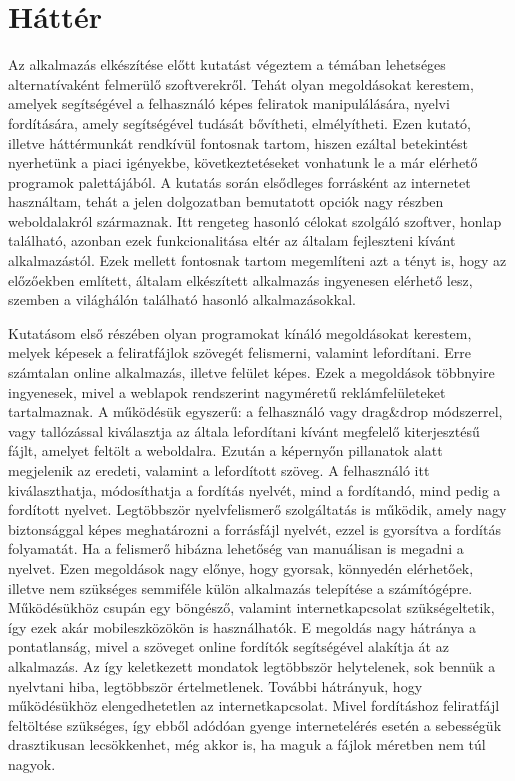 \chapter{Háttér}
Az alkalmazás elkészítése előtt kutatást végeztem a témában lehetséges alternatívaként felmerülő szoftverekről. Tehát olyan megoldásokat kerestem, amelyek segítségével a felhasználó képes feliratok manipulálására, nyelvi fordítására, amely segítségével tudását bővítheti, elmélyítheti. Ezen kutató, illetve háttérmunkát rendkívül fontosnak tartom, hiszen ezáltal betekintést nyerhetünk a piaci igényekbe, következtetéseket vonhatunk le a már elérhető programok palettájából. A kutatás során elsődleges forrásként az internetet használtam, tehát a jelen dolgozatban bemutatott opciók nagy részben weboldalakról származnak. Itt rengeteg hasonló célokat szolgáló szoftver, honlap található, azonban ezek funkcionalitása eltér az általam fejleszteni kívánt alkalmazástól. Ezek mellett fontosnak tartom megemlíteni azt a tényt is, hogy az előzőekben említett, általam elkészített alkalmazás ingyenesen elérhető lesz, szemben a világhálón található hasonló alkalmazásokkal.

Kutatásom első részében olyan programokat kínáló megoldásokat kerestem, melyek képesek a feliratfájlok szövegét felismerni, valamint lefordítani. Erre számtalan online alkalmazás, illetve felület képes. Ezek a megoldások többnyire ingyenesek, mivel a weblapok rendszerint nagyméretű reklámfelületeket tartalmaznak. A működésük egyszerű: a felhasználó vagy drag\&drop módszerrel, vagy tallózással kiválasztja az általa lefordítani kívánt megfelelő kiterjesztésű fájlt, amelyet feltölt a weboldalra. Ezután a képernyőn pillanatok alatt megjelenik az eredeti, valamint a lefordított szöveg. A felhasználó itt kiválaszthatja, módosíthatja a fordítás nyelvét, mind a fordítandó, mind pedig a fordított nyelvet. Legtöbbször nyelvfelismerő szolgáltatás is működik, amely nagy biztonsággal képes meghatározni a forrásfájl nyelvét, ezzel is gyorsítva a fordítás folyamatát. Ha a felismerő hibázna lehetőség van manuálisan is megadni a nyelvet. Ezen megoldások nagy előnye, hogy gyorsak, könnyedén elérhetőek, illetve nem szükséges semmiféle külön alkalmazás telepítése a számítógépre. Működésükhöz csupán egy böngésző, valamint internetkapcsolat szükségeltetik, így ezek akár mobileszközökön is használhatók. E megoldás nagy hátránya a pontatlanság, mivel a szöveget online fordítók segítségével alakítja át az alkalmazás. Az így keletkezett mondatok legtöbbször helytelenek, sok bennük a nyelvtani hiba, legtöbbször értelmetlenek. További hátrányuk, hogy működésükhöz elengedhetetlen az internetkapcsolat. Mivel fordításhoz feliratfájl feltöltése szükséges, így ebből adódóan gyenge internetelérés esetén a sebességük drasztikusan lecsökkenhet, még akkor is, ha maguk a fájlok méretben nem túl nagyok.

